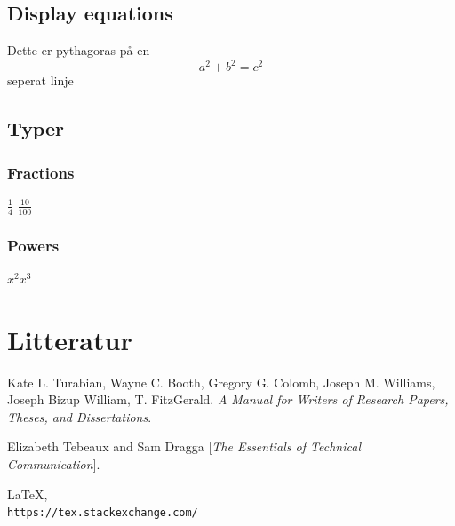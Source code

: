 \documentclass{article}
\begin{document}
    \subsection{Display equations}
    Dette er pythagoras på en \[ a^2 + b^2 = c^2 \]
    seperat linje
    \subsection{Typer}
    \subsubsection{Fractions}
    $\frac{1}{4}$ $\frac{10}{100}$
    \subsubsection{Powers}
    \(x^2 x^3\)
\newpage
    \section{Litteratur}
    \begin{thebibliography}{9}
        Kate L. Turabian, Wayne C. Booth, Gregory G. Colomb, Joseph M. Williams, Joseph Bizup William, T. FitzGerald. 
        \textit{A Manual for Writers of Research Papers, Theses, and Dissertations}. 
        
        Elizabeth Tebeaux and Sam Dragga
        [\textit{The Essentials of Technical Communication}]. 
        
        \LaTeX,
        \\\texttt{https://tex.stackexchange.com/}
    \end{thebibliography}
\end{document}
